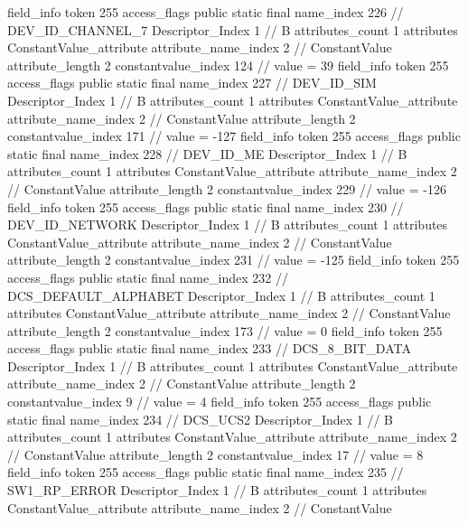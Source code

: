 {{{{{{{				}
				}
			}
			field_info {
				token	255
				access_flags	public static final
				name_index	226		// DEV_ID_CHANNEL_7
				Descriptor_Index	1		// B
				attributes_count	1
				attributes {
				ConstantValue_attribute {
					attribute_name_index	2		// ConstantValue
					attribute_length	2
					constantvalue_index	124		// value = 39
				}
				}
			}
			field_info {
				token	255
				access_flags	public static final
				name_index	227		// DEV_ID_SIM
				Descriptor_Index	1		// B
				attributes_count	1
				attributes {
				ConstantValue_attribute {
					attribute_name_index	2		// ConstantValue
					attribute_length	2
					constantvalue_index	171		// value = -127
				}
				}
			}
			field_info {
				token	255
				access_flags	public static final
				name_index	228		// DEV_ID_ME
				Descriptor_Index	1		// B
				attributes_count	1
				attributes {
				ConstantValue_attribute {
					attribute_name_index	2		// ConstantValue
					attribute_length	2
					constantvalue_index	229		// value = -126
				}
				}
			}
			field_info {
				token	255
				access_flags	public static final
				name_index	230		// DEV_ID_NETWORK
				Descriptor_Index	1		// B
				attributes_count	1
				attributes {
				ConstantValue_attribute {
					attribute_name_index	2		// ConstantValue
					attribute_length	2
					constantvalue_index	231		// value = -125
				}
				}
			}
			field_info {
				token	255
				access_flags	public static final
				name_index	232		// DCS_DEFAULT_ALPHABET
				Descriptor_Index	1		// B
				attributes_count	1
				attributes {
				ConstantValue_attribute {
					attribute_name_index	2		// ConstantValue
					attribute_length	2
					constantvalue_index	173		// value = 0
				}
				}
			}
			field_info {
				token	255
				access_flags	public static final
				name_index	233		// DCS_8_BIT_DATA
				Descriptor_Index	1		// B
				attributes_count	1
				attributes {
				ConstantValue_attribute {
					attribute_name_index	2		// ConstantValue
					attribute_length	2
					constantvalue_index	9		// value = 4
				}
				}
			}
			field_info {
				token	255
				access_flags	public static final
				name_index	234		// DCS_UCS2
				Descriptor_Index	1		// B
				attributes_count	1
				attributes {
				ConstantValue_attribute {
					attribute_name_index	2		// ConstantValue
					attribute_length	2
					constantvalue_index	17		// value = 8
				}
				}
			}
			field_info {
				token	255
				access_flags	public static final
				name_index	235		// SW1_RP_ERROR
				Descriptor_Index	1		// B
				attributes_count	1
				attributes {
				ConstantValue_attribute {
					attribute_name_index	2		// ConstantValue
}}}}}}}

